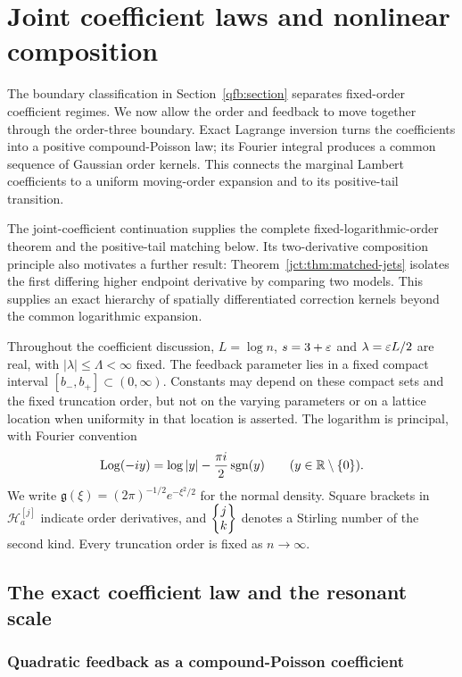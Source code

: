 \section{Joint coefficient laws and nonlinear composition}
\label{jct:section}

The boundary classification in Section~\ref{qfb:section} separates
fixed-order coefficient regimes. We now allow the order and feedback to
move together through the order-three boundary. Exact Lagrange inversion
turns the coefficients into a positive compound-Poisson law; its Fourier
integral produces a common sequence of Gaussian order kernels. This
connects the marginal Lambert coefficients to a uniform moving-order
expansion and to its positive-tail transition.

The joint-coefficient continuation \cite{jct:report} supplies the complete
fixed-logarithmic-order theorem and the positive-tail matching below.
Its two-derivative composition principle also motivates a further result:
Theorem~\ref{jct:thm:matched-jets} isolates the first differing higher
endpoint derivative by comparing two models. This supplies an exact
hierarchy of spatially differentiated correction kernels beyond the
common logarithmic expansion.

Throughout the coefficient discussion, $L=\log n$, $s=3+\varepsilon$ and
$\lambda=\varepsilon L/2$ are real, with $|\lambda|\le\Lambda<\infty$ fixed.
The feedback parameter lies in a fixed compact interval
$[b_-,b_+]\subset(0,\infty)$. Constants may depend on these compact
sets and the fixed truncation order, but not on the varying parameters
or on a lattice location when uniformity in that location is asserted.
The logarithm is principal, with Fourier convention
\begin{equation}\label{jct:eq:fourier-log}
 \operatorname{Log}(-iy)=\log|y|-\frac{\pi i}{2}\operatorname{sgn}(y)
 \qquad(y\in\mathbb R\setminus\{0\}).
\end{equation}
We write $\mathfrak g(\xi)=(2\pi)^{-1/2}e^{-\xi^2/2}$ for the normal
density. Square brackets in $\mathcal H_a^{[j]}$ indicate order
derivatives, and $\left\{\begin{matrix}j\\k\end{matrix}\right\}$ denotes a Stirling number of the
second kind. Every truncation order is fixed as $n\to\infty$.

\subsection{The exact coefficient law and the resonant scale}
\label{jct:sec:model}

\subsubsection{Quadratic feedback as a compound-Poisson coefficient}

